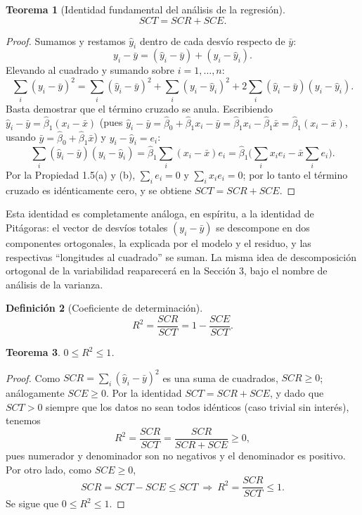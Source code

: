 \documentclass[11pt,a4paper]{article}
\theoremstyle{plain}
\newtheorem{teorema}{Teorema}[section]
\theoremstyle{definition}
\newtheorem{definicion}[teorema]{Definición}
\theoremstyle{remark}
\begin{document}
\begin{teorema}[Identidad fundamental del análisis de la regresión]
\[
SCT = SCR + SCE.
\]
\end{teorema}

\begin{proof}
Sumamos y restamos $\hat y_i$ dentro de cada desvío respecto de $\bar y$:
\[
y_i-\bar y = (\hat y_i-\bar y) + (y_i-\hat y_i).
\]
Elevando al cuadrado y sumando sobre $i=1,\dots,n$:
\[
\sum_i (y_i-\bar y)^2 = \sum_i (\hat y_i-\bar y)^2 + \sum_i (y_i-\hat y_i)^2 + 2\sum_i (\hat y_i-\bar y)(y_i-\hat y_i).
\]
Basta demostrar que el término cruzado se anula. Escribiendo $\hat y_i-\bar y = \hat\beta_1(x_i-\bar x)$ (pues $\hat y_i-\bar y = \hat\beta_0+\hat\beta_1x_i-\bar y = \hat\beta_1x_i-\hat\beta_1\bar x=\hat\beta_1(x_i-\bar x)$, usando $\bar y=\hat\beta_0+\hat\beta_1\bar x$) y $y_i-\hat y_i=e_i$:
\[
\sum_i (\hat y_i-\bar y)(y_i-\hat y_i) = \hat\beta_1\sum_i (x_i-\bar x)e_i = \hat\beta_1\Big(\sum_i x_ie_i - \bar x\sum_i e_i\Big).
\]
Por la Propiedad 1.5(a) y (b), $\sum_i e_i=0$ y $\sum_i x_ie_i=0$; por lo tanto el término cruzado es idénticamente cero, y se obtiene $SCT=SCR+SCE$.
\end{proof}

Esta identidad es completamente análoga, en espíritu, a la identidad de Pitágoras: el vector de desvíos totales $(y_i-\bar y)$ se descompone en dos componentes ortogonales, la explicada por el modelo y el residuo, y las respectivas ``longitudes al cuadrado'' se suman. La misma idea de descomposición ortogonal de la variabilidad reaparecerá en la Sección 3, bajo el nombre de análisis de la varianza.

\begin{definicion}[Coeficiente de determinación]
\[
R^2 = \frac{SCR}{SCT} = 1-\frac{SCE}{SCT}.
\]
\end{definicion}

\begin{teorema}
$0\leq R^2\leq 1$.
\end{teorema}

\begin{proof}
Como $SCR=\sum_i(\hat y_i-\bar y)^2$ es una suma de cuadrados, $SCR\geq 0$; análogamente $SCE\geq 0$. Por la identidad $SCT=SCR+SCE$, y dado que $SCT>0$ siempre que los datos no sean todos idénticos (caso trivial sin interés), tenemos
\[
R^2 = \frac{SCR}{SCT} = \frac{SCR}{SCR+SCE} \geq 0,
\]
pues numerador y denominador son no negativos y el denominador es positivo. Por otro lado, como $SCE\geq0$,
\[
SCR = SCT-SCE \leq SCT \ \Longrightarrow\ R^2=\frac{SCR}{SCT}\leq 1.
\]
Se sigue que $0\leq R^2\leq1$.
\end{proof}
\end{document}
